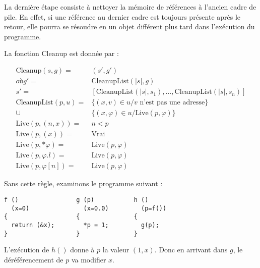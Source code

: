 La dernière étape consiste à nettoyer la mémoire de références à l'ancien cadre
de pile. En effet, si une référence au dernier cadre est toujours présente après
le retour, elle pourra se résoudre en un objet différent plus tard dans
l'exécution du programme.

La fonction $\mathrm{Cleanup}$ est donnée par :

\def\cleanuplist#1#2{\mathrm{CleanupList}(#1, #2)}
\def\cllive#1#2{\mathrm{Live}(#1, #2)}

\begin{align*}
  \mathrm{Cleanup}(s, g)  = & (s', g') \\
                    où g' = & \cleanuplist{|s|}{g} \\
                       s' = & [\cleanuplist{|s|}{s_1},
                            …, \cleanuplist{|s|}{s_n}] \\
       \cleanuplist{p}{u} = & \{(x, v) ∈ u / v\mbox{ n'est pas une adresse} \} \\
                       \cup & \{(x, φ) ∈ u / \cllive{p}{φ} \} \\
    \cllive{p}{(n, x)} = & n < p \\
    \cllive{p}{(x)}    = & \mathrm{Vrai} \\
    \cllive{p}{*φ}     = & \cllive{p}{φ} \\
    \cllive{p}{φ.l}    = & \cllive{p}{φ} \\
    \cllive{p}{φ[n]}   = & \cllive{p}{φ}
\end{align*}

Sans cette règle, examinons le programme suivant :

\begin{Verbatim}
f ()                g (p)           h ()
  (x=0)               (x=0.0)         (p=f())
{                   {               {
  return (&x);        *p = 1;         g(p);
}                   }               }
\end{Verbatim}

L'exécution de $h()$ donne à $p$ la valeur $(1, x)$. Donc en arrivant dans $g$, le
déréférencement de $p$ va modifier $x$.

